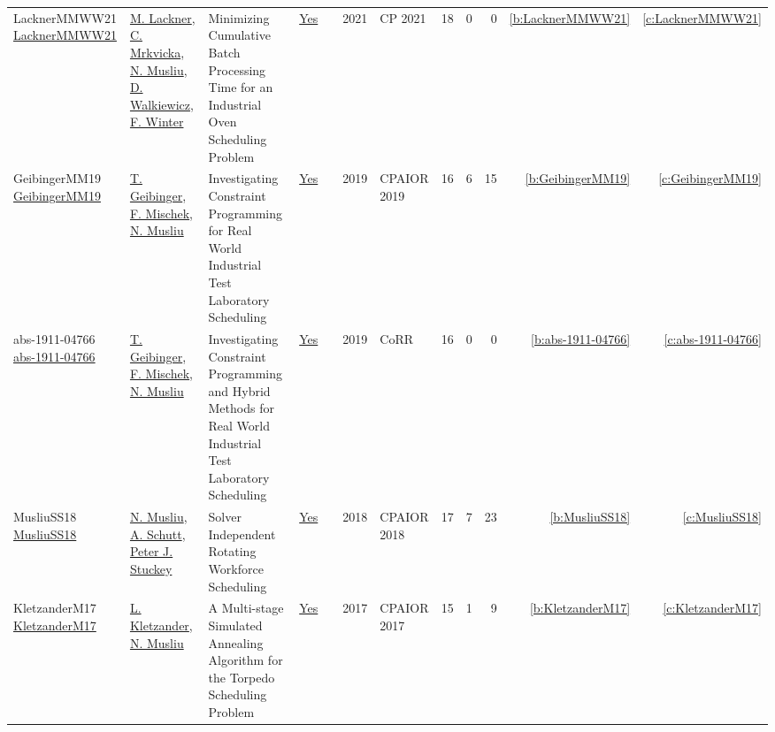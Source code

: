 {\begin{longtable}{>{\raggedright\arraybackslash}p{3cm}>{\raggedright\arraybackslash}p{6cm}>{\raggedright\arraybackslash}p{6.5cm}rrrp{2.5cm}rrrrr}
LacknerMMWW21 \href{https://doi.org/10.4230/LIPIcs.CP.2021.37}{LacknerMMWW21} & \hyperref[auth:a62]{M. Lackner}, \hyperref[auth:a63]{C. Mrkvicka}, \hyperref[auth:a45]{N. Musliu}, \hyperref[auth:a46]{D. Walkiewicz}, \hyperref[auth:a43]{F. Winter} & Minimizing Cumulative Batch Processing Time for an Industrial Oven Scheduling Problem & \href{../works/LacknerMMWW21.pdf}{Yes} & \cite{LacknerMMWW21} & 2021 & CP 2021 & 18 & 0 & 0 & \ref{b:LacknerMMWW21} & \ref{c:LacknerMMWW21}\\
GeibingerMM19 \href{https://doi.org/10.1007/978-3-030-19212-9\_20}{GeibingerMM19} & \hyperref[auth:a77]{T. Geibinger}, \hyperref[auth:a80]{F. Mischek}, \hyperref[auth:a45]{N. Musliu} & Investigating Constraint Programming for Real World Industrial Test Laboratory Scheduling & \href{../works/GeibingerMM19.pdf}{Yes} & \cite{GeibingerMM19} & 2019 & CPAIOR 2019 & 16 & 6 & 15 & \ref{b:GeibingerMM19} & \ref{c:GeibingerMM19}\\
abs-1911-04766 \href{http://arxiv.org/abs/1911.04766}{abs-1911-04766} & \hyperref[auth:a77]{T. Geibinger}, \hyperref[auth:a80]{F. Mischek}, \hyperref[auth:a45]{N. Musliu} & Investigating Constraint Programming and Hybrid Methods for Real World Industrial Test Laboratory Scheduling & \href{../works/abs-1911-04766.pdf}{Yes} & \cite{abs-1911-04766} & 2019 & CoRR & 16 & 0 & 0 & \ref{b:abs-1911-04766} & \ref{c:abs-1911-04766}\\
MusliuSS18 \href{https://doi.org/10.1007/978-3-319-93031-2\_31}{MusliuSS18} & \hyperref[auth:a45]{N. Musliu}, \hyperref[auth:a125]{A. Schutt}, \hyperref[auth:a126]{Peter J. Stuckey} & Solver Independent Rotating Workforce Scheduling & \href{../works/MusliuSS18.pdf}{Yes} & \cite{MusliuSS18} & 2018 & CPAIOR 2018 & 17 & 7 & 23 & \ref{b:MusliuSS18} & \ref{c:MusliuSS18}\\
KletzanderM17 \href{https://doi.org/10.1007/978-3-319-59776-8\_28}{KletzanderM17} & \hyperref[auth:a78]{L. Kletzander}, \hyperref[auth:a45]{N. Musliu} & A Multi-stage Simulated Annealing Algorithm for the Torpedo Scheduling Problem & \href{../works/KletzanderM17.pdf}{Yes} & \cite{KletzanderM17} & 2017 & CPAIOR 2017 & 15 & 1 & 9 & \ref{b:KletzanderM17} & \ref{c:KletzanderM17}\\
\end{longtable}
}

\clearpage
